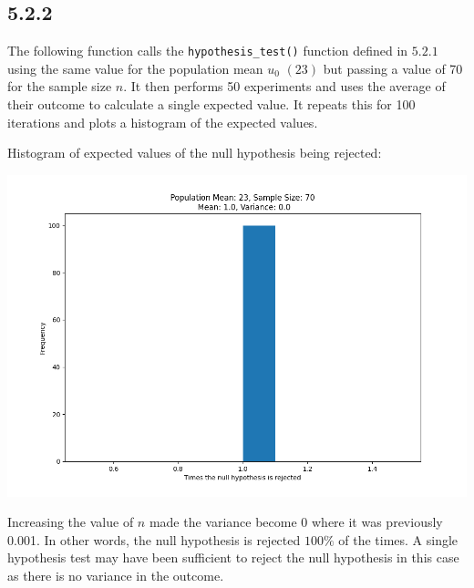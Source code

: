 \documentclass[answers]{exam}
\begin{document}
\subsection*{5.2.2}
The following function calls the \texttt{hypothesis\_test()} function defined in $5.2.1$ using the same value for the population mean $u_0$ $(23)$ but passing a value of 70 for the sample size $n$. It then performs 50 experiments and uses the average of their outcome to calculate a single expected value. It repeats this for 100 iterations and plots a histogram of the expected values.

Histogram of expected values of the null hypothesis being rejected:
\begin{center}
  \includegraphics[scale = 0.5]{Q5_histograms/Q5.2.2.png}
\end{center}
Increasing the value of $n$ made the variance become $0$ where it was previously 0.001. In other words, the null hypothesis is rejected $100\%$ of the times. A single hypothesis test may have been sufficient to reject the null hypothesis in this case as there is no variance in the outcome.
\end{document}
